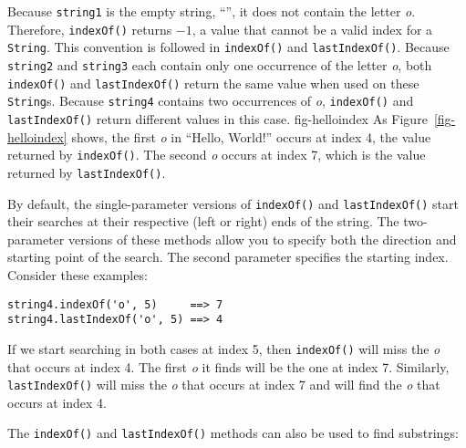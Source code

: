 \noindent Because {\tt string1} is the empty string, ``'', it does not
contain the letter {\it o}. Therefore, {\tt indexOf()} returns $-1$, a
value that cannot be a valid index for a {\tt String}. This convention
is followed in {\tt indexOf()} and {\tt lastIndexOf()}.  Because
{\tt string2} and {\tt string3} each contain only one occurrence of the
letter {\it o}, both {\tt indexOf()} and {\tt lastIndexOf()} return the
same value when used on these {\tt String}s.  Because {\tt string4}
contains two occurrences of {\it o}, {\tt indexOf()} and
{\tt lastIndexOf()} return different values in this case.
{fig-helloindex}
As Figure~\ref{fig-helloindex} shows, the first {\it o} in ``Hello, World!''
occurs at index 4, the value returned by {\tt indexOf()}. The second
{\it o} occurs at index 7, which is the value returned by
{\tt lastIndexOf()}.

By default, the single-parameter versions of {\tt indexOf()} and
{\tt last\-IndexOf()} start their searches at their respective (left or
right) ends of the string.   The two-parameter versions of these
methods allow you to specify both the direction and starting point of
the search.   The second parameter specifies the starting
index.  Consider these examples:

\begin{jjjlisting}
\begin{lstlisting}
string4.indexOf('o', 5)     ==> 7
string4.lastIndexOf('o', 5) ==> 4
\end{lstlisting}
\end{jjjlisting}

\noindent If we start searching in both cases at index 5, then
{\tt indexOf()} will miss the {\it o} that occurs at index 4. The first
{\it o} it finds will be the one at index 7. Similarly,
{\tt lastIndexOf()} will miss the {\it o} that occurs at index 7 and will find
the {\it o} that occurs at index 4.

The {\tt indexOf()} and {\tt lastIndexOf()} methods can also be used
to find substrings:


